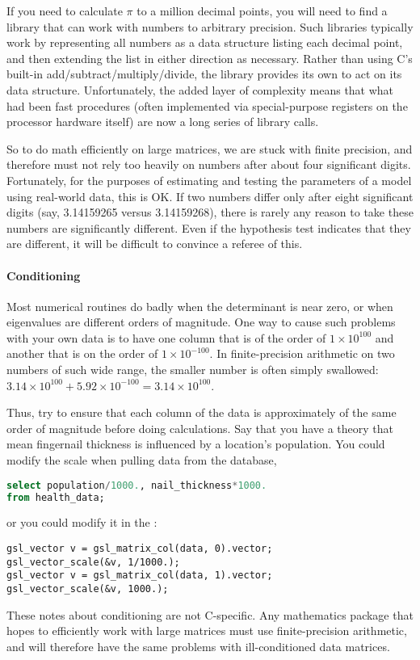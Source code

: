 If you need to calculate $\pi$ to a million decimal points, you
will need to find a library that can work with numbers to arbitrary
precision. Such libraries typically work by representing all numbers
as a data structure listing each decimal point, and then extending the
list in either direction as necessary. Rather than using C's built-in
add/subtract/multiply/divide, the library provides its own to act on
its data structure. Unfortunately, the added layer of complexity means
that what had been fast procedures (often implemented via
special-purpose registers on the processor hardware itself) are now a
long series of library calls.

So to do math efficiently on large matrices, we are stuck with finite
precision, and therefore must not
rely too heavily on numbers after about four significant digits. 
Fortunately, for the purposes of estimating and testing
the parameters of a model using real-world data, this is OK. If two
numbers differ only after eight significant digits (say, 3.14159265
versus 3.14159268), there is rarely any reason to take these numbers are
significantly different. Even if the hypothesis test indicates that they
are different, it will be difficult to convince a referee of this.


\paragraph{Conditioning} Most numerical routines do badly when the
determinant is near zero, or when eigenvalues are different orders of magnitude.
One way to cause such problems with your own data is
to have one column that is of the order of $1 \times 10^{100}$ and
another that is on the order of $1 \times 10^{-100}$. In
finite-precision arithmetic on two numbers of such wide range, the
smaller number is often simply swallowed: $3.14 \times 10^{100} + 5.92
\times 10^{-100} = 3.14 \times 10^{100}$. 

Thus, try to ensure that each column of the data is
approximately of the same order of magnitude before doing calculations.
Say that you have a theory that mean fingernail thickness is influenced by
a location's population.
You could modify the scale when pulling data from the database,
\begin{lstlisting}[language=sql]
select population/1000., nail_thickness*1000.
from health_data;
\end{lstlisting}
or you could modify it in the :
\begin{lstlisting}
gsl_vector v = gsl_matrix_col(data, 0).vector;
gsl_vector_scale(&v, 1/1000.);
gsl_vector v = gsl_matrix_col(data, 1).vector;
gsl_vector_scale(&v, 1000.);
\end{lstlisting}

These notes about conditioning are not C-specific. Any mathematics
package that hopes to efficiently work with large matrices must use
finite-precision arithmetic, and will therefore have the same problems
with ill-conditioned data matrices.
